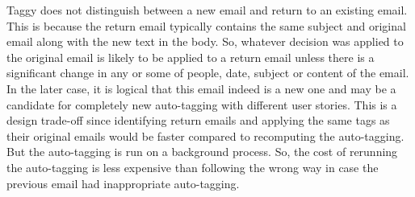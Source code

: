 Taggy does not distinguish between a new email and return to an existing email. This is because the return email typically contains the same subject and original email along with the new text in the body. So, whatever decision was applied to the original email is likely to be applied to a return email unless there is a significant change in any or some of people, date, subject or content of the email. In the later case, it is logical that this email indeed is a new one and may be a candidate for completely new auto-tagging with different user stories. This is a design trade-off since identifying return emails and applying the same tags as their original emails would be faster compared to recomputing the auto-tagging. But the auto-tagging is run on a background process. So, the cost of rerunning the auto-tagging is less expensive than following the wrong way in case the previous email had inappropriate auto-tagging.

